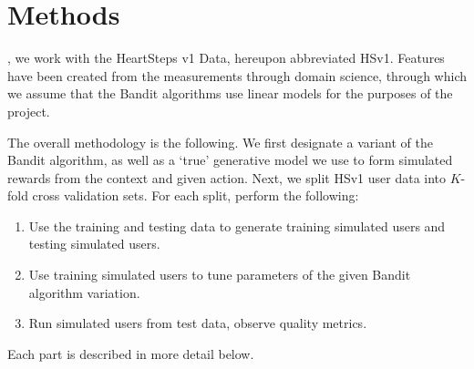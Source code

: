 
\chapter{Methods}
\label{Methods}

,  we work with the HeartSteps v1 Data, hereupon abbreviated HSv1.  Features have been created from the measurements through domain science, through which we assume that the Bandit algorithms use linear models for the purposes of the project.


The overall methodology is the following.  We first designate a variant of the Bandit algorithm, as well as a `true' generative model we use to form simulated rewards from the context and given action.  Next, we split HSv1 user data into $K$-fold cross validation sets.  For each split, perform the following:

\begin{enumerate}
	\item Use the training and testing data to generate training simulated users and testing simulated users.
	\item Use training simulated users to tune parameters of the given Bandit algorithm variation.
	\item Run simulated users from test data, observe quality metrics.
\end{enumerate}

Each part is described in more detail below.


